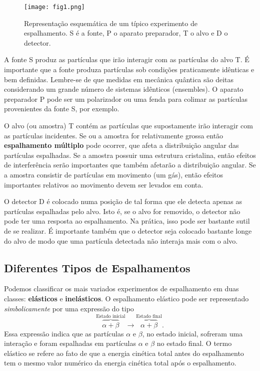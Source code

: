 \documentclass{article}
\begin{document}
\begin{figure}[h]
\centering
\texttt{[image: fig1.png]}
\caption{Representação esquemática de um típico experimento de espalhamento. S é a fonte, P o aparato preparador, T o alvo e D o detector.}
\end{figure}

\noindent A fonte S produz as partículas que irão interagir com as partículas do alvo T. É importante que a fonte produza partículas sob condições praticamente idênticas e bem definidas. Lembre-se de que medidas em mecânica quântica são deitas considerando um grande número de sistemas idênticos (ensembles). O aparato preparador P pode ser um polarizador ou uma fenda para colimar as partículas provenientes da fonte S, por exemplo.

O alvo (ou amostra) T contém as partículas que supostamente irão interagir com as partículas incidentes. Se ou a amostra for relativamente grossa então \textbf{espalhamento múltiplo} pode ocorrer, que afeta a distribuição angular das partículas espalhadas. Se a amostra possuir uma estrutura cristalina, então efeitos de interferência serão importantes que também afetarão a distribuição angular. Se a amostra consistir de partículas em movimento (um gás), então efeitos importantes relativos ao movimento devem ser levados em conta.

O detector D é colocado numa posição de tal forma que ele detecta apenas as partículas espalhadas pelo alvo. Isto é, se o alvo for removido, o detector não pode ter uma resposta ao espalhamento. Na prática, isso pode ser bastante sutil de se realizar. É importante também que o detector seja colocado bastante longe do alvo de modo que uma partícula detectada não interaja mais com o alvo.


\subsection{Diferentes Tipos de Espalhamentos}

Podemos classificar os mais variados experimentos de espalhamento em duas classes: \textbf{elásticos} e \textbf{inelásticos}. O espalhamento elástico pode ser representado \textit{simbolicamente} por uma expressão do tipo
\begin{equation}
    \overbrace{\alpha + \beta}^{\text{Estado inicial}} \rightarrow \overbrace{\alpha + \beta}^{\text{Estado final}}.
\end{equation}
Essa expressão indica que as partículas $\alpha$ e $\beta$, no estado inicial, sofreram uma interação e foram espalhadas em partículas $\alpha$ e $\beta$ no estado final. O termo elástico se refere ao fato de que a energia cinética total antes do espalhamento tem o mesmo valor numérico da energia cinética total após o espalhamento. 
\end{document}
